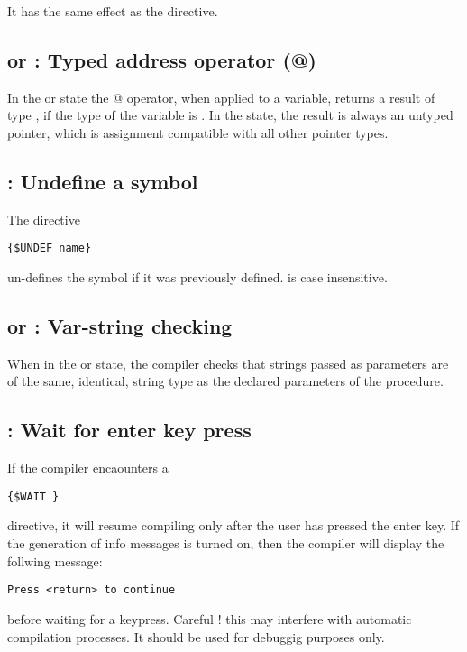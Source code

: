 \documentclass{report}
\begin{document}
It has the same effect as the  directive.

\subsection{ or  : Typed address operator (@)}

In the  or  state the @ operator,
when applied to a variable, returns a result of type , if the 
type of the variable is . In the  state, the result is
always an untyped pointer, which is assignment compatible with all other 
pointer types.

\subsection{ : Undefine a symbol}

The directive
\begin{verbatim}
{$UNDEF name}
\end{verbatim}
un-defines the symbol  if it was previously defined.
 is case insensitive.


\subsection{ or  : Var-string checking}

When in the \var{+} or  state, the compiler checks that strings 
passed as parameters are of the same, identical, string type as the declared
parameters of the procedure.

\subsection{ : Wait for enter key press}

If the compiler encaounters a
\begin{verbatim}
{$WAIT }
\end{verbatim}
directive, it will resume compiling only after the user has pressed the
enter key. If the generation of info messages is turned on, then the compiler 
will display the follwing message:
\begin{verbatim}
Press <return> to continue
\end{verbatim}
before waiting for a keypress. Careful ! this may interfere with automatic
compilation processes. It should be used for debuggig purposes only.
\end{document}
